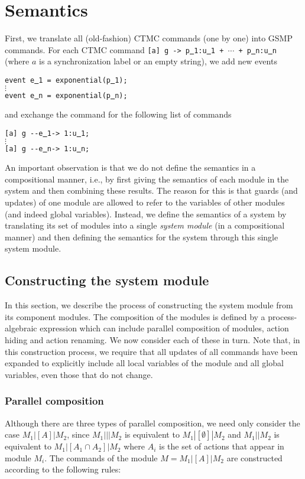 \documentclass{article}
\renewcommand{\_}{\underline{~}}
\newcommand{\code}[1]{\texttt{#1}}
\begin{document}
\section*{Semantics}

First, we translate all (old-fashion) CTMC commands (one by one) into GSMP commands.
For each CTMC command \code{[a] g -> p\_1:u\_1 + $\cdots$ + p\_n:u\_n} (where $a$ is a synchronization label or an empty string), we add 
new events 
\begin{center}
	\code{event e\_1 = exponential(p\_1);} \\
	$\vdots$ \\
	\code{event e\_n = exponential(p\_n);}
\end{center}
and exchange the command for the following list of commands
\begin{center}
	\code{[a] g {-}{-}e\_1-> 1:u\_1;} \\
	$\vdots$ \\
	\code{[a] g {-}{-}e\_n-> 1:u\_n;} 
\end{center}

An important observation is that we do not define the semantics in a compositional manner, i.e., by first giving the semantics of each module in the system and then combining these results. 
The reason for this is that guards (and updates) of one module are allowed to refer to the variables of other modules (and indeed global variables). 
Instead, we define the semantics of a system by translating its set of modules into a single \emph{system module} (in a compositional manner) and then defining the semantics for the system through this single system module.


\subsection*{Constructing the system module}
In this section, we describe the process of constructing the system module from its component modules. 
The composition of the modules is defined by a process-algebraic expression which can include parallel composition of modules, action hiding and action renaming. 
We now consider each of these in turn. Note that, in this construction process, we require that all updates of all commands have been expanded to explicitly include all local variables of the module and all global variables, even those that do not change.


\subsubsection*{Parallel composition}
Although there are three types of parallel composition, we need only consider the case
$M_1|[A]|M_2$, since $M_1|||M_2$ is equivalent to $M_1|[\emptyset]|M_2$ and $M_1||M_2$ is equivalent to $M_1|[A_1 \cap A_2]|M_2$ where $A_i$ is the set of actions that appear in module $M_i$. 
The commands of the module $M = M_1|[A]|M_2$ are constructed according to the following rules:
\end{document}
